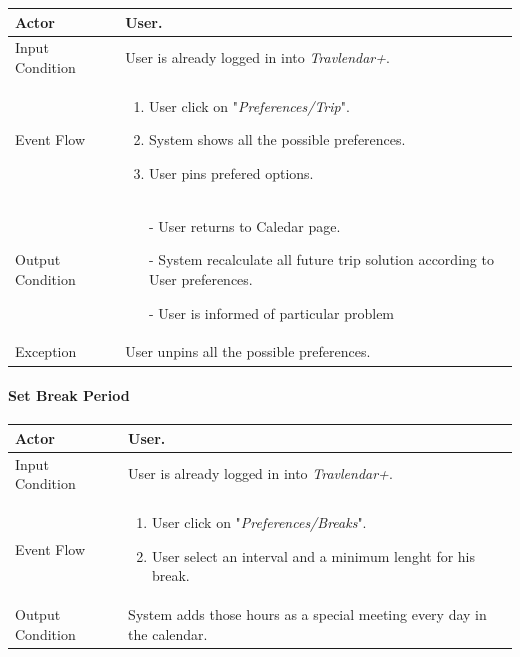 		\begin{tabular}{| l | p{} | }
			\hline
			\hline
			Actor	&		User. \\
			\hline
			Input Condition		&		User is already logged in into \textit{Travlendar+}. \\
			\hline
			Event Flow		&		\begin{enumerate}
												\item User click on "\textit{Preferences/Trip}".
												\item System shows all the possible preferences.
												\item User pins prefered options.
											\end{enumerate} \\
			\hline
			Output Condition		&		\begin{itemize}
													\item[-] User returns to Caledar page.
													\item[-] System recalculate all future trip solution according to User preferences.
													\item[-] User is informed of particular problem
												\end{itemize} \\
			\hline
			Exception		&		User unpins all the possible preferences. \\
			
			\hline
			\hline
		\end{tabular}
		
		

	\paragraph{Set Break Period}
	
		\begin{tabular}{| l | p{} | }
			\hline
			\hline
			Actor	&		User. \\
			\hline
			Input Condition		&		User is already logged in into \textit{Travlendar+}. \\
			\hline
			Event Flow		&		\begin{enumerate}
												\item User click on "\textit{Preferences/Breaks}".
												\item User select an interval and a minimum lenght for his break.
											\end{enumerate} \\
			\hline
			Output Condition		&		System adds those hours as a special meeting every day in the calendar. \\
			\hline
			\hline
		\end{tabular}
